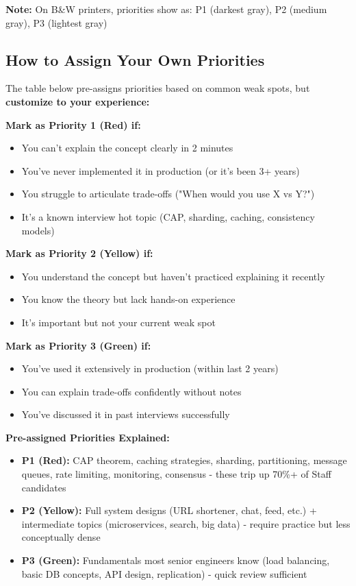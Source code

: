 \documentclass[10pt]{article}
\begin{document}
\textbf{Note:} On B\&W printers, priorities show as: P1 (darkest gray), P2 (medium gray), P3 (lightest gray)

\subsection{How to Assign Your Own Priorities}

The table below pre-assigns priorities based on common weak spots, but \textbf{customize to your experience:}

\textbf{Mark as Priority 1 (Red) if:}
\begin{itemize}
\item You can't explain the concept clearly in 2 minutes
\item You've never implemented it in production (or it's been 3+ years)
\item You struggle to articulate trade-offs ("When would you use X vs Y?")
\item It's a known interview hot topic (CAP, sharding, caching, consistency models)
\end{itemize}

\textbf{Mark as Priority 2 (Yellow) if:}
\begin{itemize}
\item You understand the concept but haven't practiced explaining it recently
\item You know the theory but lack hands-on experience
\item It's important but not your current weak spot
\end{itemize}

\textbf{Mark as Priority 3 (Green) if:}
\begin{itemize}
\item You've used it extensively in production (within last 2 years)
\item You can explain trade-offs confidently without notes
\item You've discussed it in past interviews successfully
\end{itemize}

\textbf{Pre-assigned Priorities Explained:}
\begin{itemize}
\item \textbf{P1 (Red):} CAP theorem, caching strategies, sharding, partitioning, message queues, rate limiting, monitoring, consensus - these trip up 70\%+ of Staff candidates
\item \textbf{P2 (Yellow):} Full system designs (URL shortener, chat, feed, etc.) + intermediate topics (microservices, search, big data) - require practice but less conceptually dense
\item \textbf{P3 (Green):} Fundamentals most senior engineers know (load balancing, basic DB concepts, API design, replication) - quick review sufficient
\end{itemize}
\end{document}
